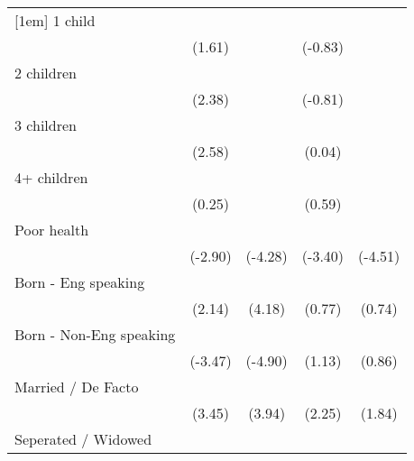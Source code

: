 {\begin{tabular}{l*{4}{c}}
[1em]
1 child             &                     &                     &                     &                     \\
                    &      (1.61)         &                     &     (-0.83)         &                     \\
[1em]
2 children          &            \sym{*}  &                     &                     &                     \\
                    &      (2.38)         &                     &     (-0.81)         &                     \\
[1em]
3 children          &            \sym{*}  &                     &                     &                     \\
                    &      (2.58)         &                     &      (0.04)         &                     \\
[1em]
4+ children         &                     &                     &                     &                     \\
                    &      (0.25)         &                     &      (0.59)         &                     \\
[1em]
Poor health         &            \sym{**} &            \sym{***}&            \sym{***}&            \sym{***}\\
                    &     (-2.90)         &     (-4.28)         &     (-3.40)         &     (-4.51)         \\
[1em]
Born - Eng speaking &            \sym{*}  &            \sym{***}&                     &                     \\
                    &      (2.14)         &      (4.18)         &      (0.77)         &      (0.74)         \\
[1em]
Born - Non-Eng speaking&            \sym{***}&            \sym{***}&                     &                     \\
                    &     (-3.47)         &     (-4.90)         &      (1.13)         &      (0.86)         \\
[1em]
Married / De Facto  &            \sym{***}&            \sym{***}&            \sym{*}  &                     \\
                    &      (3.45)         &      (3.94)         &      (2.25)         &      (1.84)         \\
[1em]
Seperated / Widowed &                     &                     &                     &                     \\

\end{tabular}}
